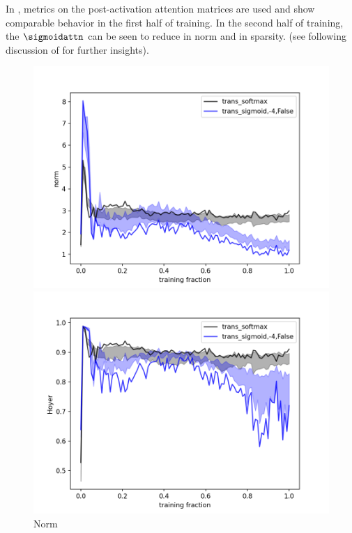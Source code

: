 In , metrics on the post-activation attention matrices are used and show comparable behavior in the first half of training.  
In the second half of training, the $\sigmoidattn$ can be seen to reduce in norm and in sparsity. (see following discussion of  for further insights).

\begin{figure}[h]
  \centering
  \begin{minipage}[b]{0.45\textwidth}
    \includegraphics[width=\textwidth]{figures/norm_training_1_head.png}
    \captionsetup{labelformat=empty}
    \caption{Norm}
    \addtocounter{figure}{-1}
  \end{minipage}
  \hfill
  \begin{minipage}[b]{0.45\textwidth}
    \includegraphics[width=\textwidth]{figures/hoyer_training_1_head.png}

\end{minipage}
\end{figure}
